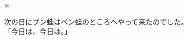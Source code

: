 \documentclass[
a4paper,
10pt,
book]
{tarticle}
\begin{document}
\indent \indent \indent \indent \indent \indent \indent \indent \indent \indent ※

\begin{linenumbers}
    次の日にブン蛙はベン蛙のところへやって来たのでした。\\
    「今日は、今日は。」
\end{linenumbers}

\newpage
\setcounter{page}{18}
\thispagestyle{fancy}
\end{document}
